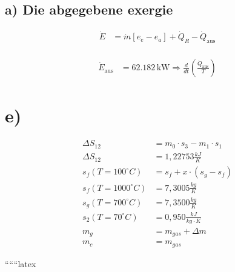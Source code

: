 \subsection*{a) Die abgegebene exergie}

\begin{align*}
\dot{E} &= \dot{m} \left[ e_e - e_a \right] + \dot{Q}_R - \dot{Q}_{\text{aus}} \\
\end{align*}

\begin{align*}
\dot{E}_{\text{aus}} &= 62.182 \, \text{kW} \Rightarrow \frac{d}{dt} \left( \frac{\dot{Q}_{\text{aus}}}{T} \right)
\end{align*}



\section*{e)}

\begin{align*}
\Delta S_{12} &= m_0 \cdot s_3 - m_1 \cdot s_1 \\
\Delta S_{12} &= 1,22753 \frac{kJ}{K} \\
s_f(T = 100^\circ C) &= s_f + x \cdot (s_g - s_f) \\
s_f(T = 1000^\circ C) &= 7,3005 \frac{kg}{K} \\
s_g(T = 700^\circ C) &= 7,3500 \frac{kg}{K} \\
s_2(T = 70^\circ C) &= 0,950 \frac{kJ}{kg \cdot K} \\
m_g &= m_{gas} + \Delta m \\
m_c &= m_{gas}
\end{align*}

``````latex